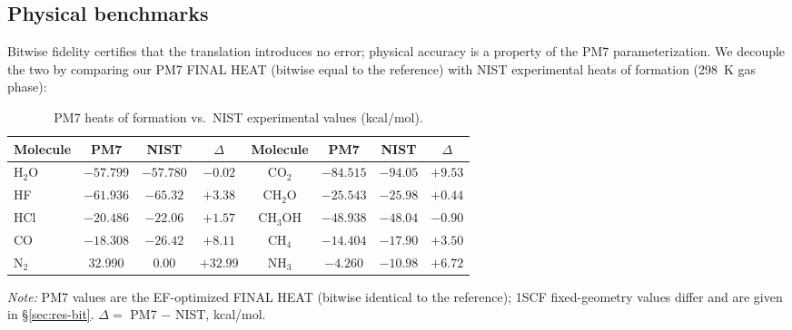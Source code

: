 \documentclass[preprint,12pt]{elsarticle}
\begin{document}
\subsection{Physical benchmarks}\label{sec:res-phys}

Bitwise fidelity certifies that the translation introduces no error; physical accuracy is a property of the PM7 parameterization. We decouple the two by comparing our PM7 FINAL HEAT (bitwise equal to the reference) with NIST experimental heats of formation (298~K gas phase):
\begin{table}[h]
\centering
\caption{PM7 heats of formation vs.\ NIST experimental values (kcal/mol).}\label{tab:pm7}
\begin{tabular}{lccc|cccc}
\toprule
Molecule & PM7 & NIST & $\Delta$ & Molecule & PM7 & NIST & $\Delta$ \\
\midrule
H$_2$O & $-57.799$ & $-57.780$ & $-0.02$ & CO$_2$ & $-84.515$ & $-94.05$ & $+9.53$ \\
HF & $-61.936$ & $-65.32$ & $+3.38$ & CH$_2$O & $-25.543$ & $-25.98$ & $+0.44$ \\
HCl & $-20.486$ & $-22.06$ & $+1.57$ & CH$_3$OH & $-48.938$ & $-48.04$ & $-0.90$ \\
CO & $-18.308$ & $-26.42$ & $+8.11$ & CH$_4$ & $-14.404$ & $-17.90$ & $+3.50$ \\
N$_2$ & 32.990 & 0.00 & $+32.99$ & NH$_3$ & $-4.260$ & $-10.98$ & $+6.72$ \\
\bottomrule
\end{tabular}
\smallskip\small{\emph{Note:} PM7 values are the EF-optimized FINAL HEAT (bitwise identical to the reference); 1SCF fixed-geometry values differ and are given in \S\ref{sec:res-bit}. $\Delta=$ PM7 $-$ NIST, kcal/mol.}
\end{table}
\end{document}
